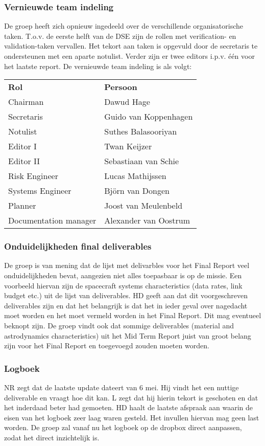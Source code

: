 \subsubsection{Vernieuwde team indeling}
De groep heeft zich opnieuw ingedeeld over de verschillende organisatorische taken. T.o.v. de eerste helft van de DSE zijn de rollen met verification- en validation-taken vervallen. Het tekort aan taken is opgevuld door de secretaris te ondersteunen met een aparte notulist. Verder zijn er twee editors i.p.v. één voor het laatste report.
\newline\newline
De vernieuwde team indeling is als volgt:
\begin{tabular}{ll}
	\textbf{Rol}	&	\textbf{Persoon}\\
	Chairman & Dawud Hage\\
	Secretaris & Guido van Koppenhagen\\
	Notulist & Suthes Balasooriyan\\
	Editor I & Twan Keijzer\\
	Editor II & Sebastiaan van Schie\\
	Risk Engineer & Lucas Mathijssen\\
	Systems Engineer & Bj\"{o}rn van Dongen\\
	Planner & Joost van Meulenbeld\\
	Documentation manager & Alexander van Oostrum\\
\end{tabular}

\subsubsection{Onduidelijkheden final deliverables}
De groep is van mening dat de lijst met delivarbles voor het Final Report veel onduidelijkheden bevat, aangezien niet alles toepasbaar is op de missie. Een voorbeeld hiervan zijn de spacecraft systems characteristics (data rates, link budget etc.) uit de lijst van deliverables. HD geeft aan dat dit voorgeschreven deliverables zijn en dat het belangrijk is dat het in ieder geval over nagedacht moet worden en het moet vermeld worden in het Final Report. Dit mag eventueel beknopt zijn. De groep vindt ook dat sommige deliverables (material and astrodynamics characteristics) uit het Mid Term Report juist van groot belang zijn voor het Final Report en toegevoegd zouden moeten worden.

\subsubsection{Logboek}
NR zegt dat de laatste update dateert van 6 mei. Hij vindt het een nuttige deliverable en vraagt hoe dit kan. L zegt dat hij hierin tekort is geschoten en dat het inderdaad beter had gemoeten. HD haalt de laatste afspraak aan waarin de eisen van het logboek zeer laag waren gesteld. Het invullen hiervan mag geen last worden. De groep zal vanaf nu het logboek op de dropbox direct aanpassen, zodat het direct inzichtelijk is.

